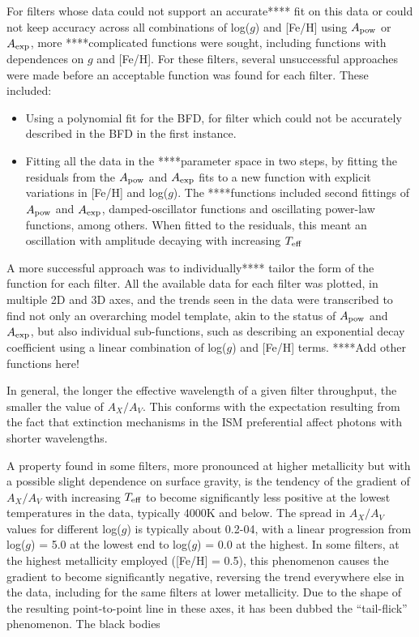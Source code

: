 \documentclass[12pt, a4paper]{report}
\begin{document}
For filters whose data could not support an accurate**** fit on this data or could not keep accuracy across all combinations of log($g$) and [Fe/H] using $A_{\textnormal{pow}}$ or $A_{\textnormal{exp}}$, more ****complicated functions were sought, including functions with dependences on $g$ and [Fe/H].
For these filters, several unsuccessful approaches were made before an acceptable function was found for each filter. These included:
\begin{itemize}
\item Using a polynomial fit for the BFD, for filter which could not be accurately described in the BFD in the first instance.
\item Fitting all the data in the ****parameter space in two steps, by fitting the residuals from the $A_{\textnormal{pow}}$ and $A_{\textnormal{exp}}$ fits to a new function with explicit variations in [Fe/H] and log($g$). The ****functions included second fittings of $A_{\textnormal{pow}}$ and $A_{\textnormal{exp}}$, damped-oscillator functions and oscillating power-law functions, among others. When fitted to the residuals, this meant an oscillation with amplitude decaying with increasing $T_{\textnormal{eff}}$
\end{itemize}


A more successful approach was to individually**** tailor the form of the function for each filter. All the available data for each filter was plotted, in multiple 2D and 3D axes, and the trends seen in the data were transcribed to find not only an overarching model template, akin to the status of $A_{\textnormal{pow}}$ and $A_{\textnormal{exp}}$, but also individual sub-functions, such as describing an exponential decay coefficient using a linear combination of log($g$) and [Fe/H] terms.
****Add other functions here!

In general, the longer the effective wavelength of a given filter throughput, the smaller the value of $A_{X}/A_{V}$. This conforms with the expectation resulting from the fact that extinction mechanisms in the ISM preferential affect photons with shorter wavelengths.

A property found in some filters, more pronounced at higher metallicity but with a possible slight dependence on surface gravity, is the tendency of the gradient of $A_{X}/A_{V}$ with increasing $T_{\textnormal{eff}}$ to become significantly less positive at the lowest temperatures in the data, typically 4000K and below. The spread in $A_{X}/A_{V}$ values for different log($g$) is typically about 0.2-04, with a linear progression from log($g$) = 5.0 at the lowest end to log($g$) = 0.0 at the highest. In some filters, at the highest metallicity employed ([Fe/H] = 0.5), this phenomenon causes the gradient to become significantly negative, reversing the trend everywhere else in the data, including for the same filters at lower metallicity. Due to the shape of the resulting point-to-point line in these axes, it has been dubbed the ``tail-flick'' phenomenon. The black bodies
\end{document}
